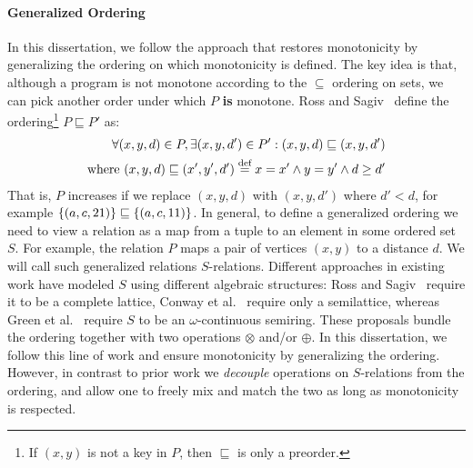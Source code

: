  \paragraph*{\bf Generalized Ordering}
 In this dissertation, we follow the approach that restores monotonicity by
 generalizing the ordering on which monotonicity is defined.  The key
 idea is that, although a program is not monotone according to the
 $\subseteq$ ordering on sets, we can pick another order under which
 $P$ \textbf{is} monotone.  Ross and
 Sagiv~\cite{DBLP:conf/pods/RossS92} define the ordering\footnote{If
   $(x, y)$ is not a key in $P$, then $\sqsubseteq$ is only a
   preorder.}  $P \sqsubseteq P'$ as:
 \begin{align*}
     \forall (x, y, d) \in P, \exists (x, y, d') \in P' : (x, y, d) \sqsubseteq (x, y, d') \\
     \text{where } (x, y, d) \sqsubseteq (x', y', d') \stackrel{\text{def}}{=} x = x' \wedge y = y' \wedge d \geq d'
 \end{align*}
 That is, $P$ increases if we replace $(x, y, d)$ with $(x, y, d')$
 where $d' < d$, for example $\{(a,c,21)\}\sqsubseteq \{(a,c,11)\}$. 
 In general, to define a generalized ordering we need to view a relation as a map
  from a tuple to an element in some ordered set $S$.
 For example, the relation $P$ maps a pair of vertices $(x,y)$ to a distance $d$.
 We will call such generalized relations $S$-relations.
 Different approaches in existing work have modeled $S$ using different algebraic structures:
 Ross and Sagiv~\cite{DBLP:conf/pods/RossS92} require it to be a complete lattice,
  Conway et al.~\cite{DBLP:conf/cloud/ConwayMAHM12} require only a semilattice,
  whereas Green et al.~\cite{DBLP:conf/pods/GreenKT07} require $S$ to be an $\omega$-continuous semiring.
 These proposals bundle the ordering together with two operations $\otimes$ and/or $\oplus$.
 In this dissertation, we follow this line of work and ensure monotonicity by generalizing the ordering.
 However, in contrast to prior work we {\em decouple} operations on $S$-relations from the ordering,
 and allow one to freely mix and match the two as long as monotonicity is respected.
 
